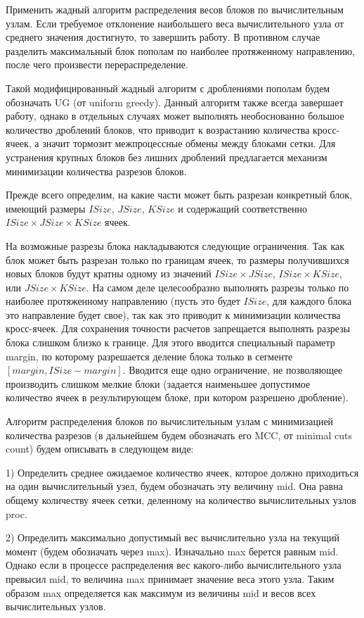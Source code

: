 Применить жадный алгоритм распределения весов блоков по вычислительным узлам.
Если требуемое отклонение наибольшего веса вычислительного узла от среднего значения достигнуто, то завершить работу.
В противном случае разделить максимальный блок пополам по наиболее протяженному направлению, после чего произвести перераспределение.

Такой модифицированный жадный алгоритм с дроблениями пополам будем обозначать UG (от uniform greedy).
Данный алгоритм также всегда завершает работу, однако в отдельных случаях может выполнять необоснованно большое количество дроблений блоков, что приводит к возрастанию количества кросс-ячеек, а значит тормозит межпроцессные обмены между блоками сетки.
Для устранения крупных блоков без лишних дроблений предлагается механизм минимизации количества разрезов блоков.

Прежде всего определим, на какие части может быть разрезан конкретный блок, имеющий размеры $ISize$, $JSize$, $KSize$ и содержащий соответственно $ISize \times JSize \times KSize$ ячеек.

На возможные разрезы блока накладываются следующие ограничения.
Так как блок может быть разрезан только по границам ячеек, то размеры получившихся новых блоков будут кратны одному из значений $ISize \times JSize$, $ISize \times KSize$, или $JSize \times KSize$.
На самом деле целесообразно выполнять разрезы только по наиболее протяженному направлению (пусть это будет $ISize$, для каждого блока это направление будет свое), так как это приводит к минимизации количества кросс-ячеек.
Для сохранения точности расчетов запрещается выполнять разрезы блока слишком близко к границе.
Для этого вводится специальный параметр margin, по которому разрешается деление блока только в сегменте $[margin, ISize - margin]$.
Вводится еще одно ограничение, не позволяющее производить слишком мелкие блоки (задается наименьшее допустимое количество ячеек в результирующем блоке, при котором разрешено дробление).

Алгоритм распределения блоков по вычислительным узлам с минимизацией количества разрезов (в дальнейшем будем обозначать его MCC, от minimal cuts count) будем описывать в следующем виде:

1) Определить среднее ожидаемое количество ячеек, которое должно приходиться на один вычислительный узел, будем обозначать эту величину mid.
Она равна общему количеству ячеек сетки, деленному на количество вычислительных узлов proc.

2) Определить максимально допустимый вес вычислительно узла на текущий момент (будем обозначать через max).
Изначально max берется равным mid.
Однако если в процессе распределения вес какого-либо вычислительного узла превысил mid, то величина max принимает значение веса этого узла.
Таким образом max определяется как максимум из величины mid и весов всех вычислительных узлов.

